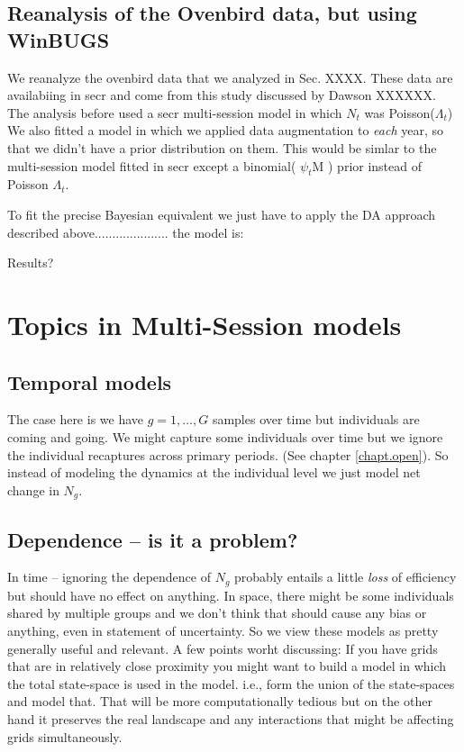\subsection{Reanalysis of the Ovenbird data, but using WinBUGS}

We reanalyze the ovenbird data that we analyzed in Sec. XXXX. These
data are availabiing in secr and come from this study discussed by
Dawson XXXXXX.
The analysis before used a secr multi-session model in which $N_{t}$
was Poisson($\Lambda_{t}$) We also fitted a model in which we applied
data augmentation to {\it each} year, so that we didn't have a prior
distribution on them.  This would be simlar to the multi-session model
fitted in secr except a binomial( $\psi_{t}$M ) prior instead of
Poisson $\Lambda_{t}$.

To fit the precise Bayesian equivalent we just have to apply the DA
approach described above..................... the model is:

Results?



\section{Topics in Multi-Session models}


\subsection{Temporal models }

The case here is we have $g=1,\ldots,G$ samples over time but
individuals are coming and going.
We might capture some individuals over time but we ignore the
individual recaptures across primary periods. (See chapter
\ref{chapt.open}). So instead of modeling the dynamics at the individual
level we just model net change in $N_{g}$.

\subsection{Dependence -- is it a problem?}

In time -- ignoring the dependence of $N_{g}$ probably entails a
little {\it loss} of efficiency but should have no effect on anything.
In space, there might be some individuals shared by multiple groups
and we don't think that should cause any bias or anything, even in
statement of uncertainty. So we view these models as pretty generally
useful and relevant.
A few points worht discussing: If you have grids that are in
relatively close proximity you might want to build a model in which
the total state-space is used in the model. i.e., form the union of
the state-spaces and model that. That will be more computationally
tedious but on the other hand it preserves the real landscape and any
interactions that might be affecting grids simultaneously. 

